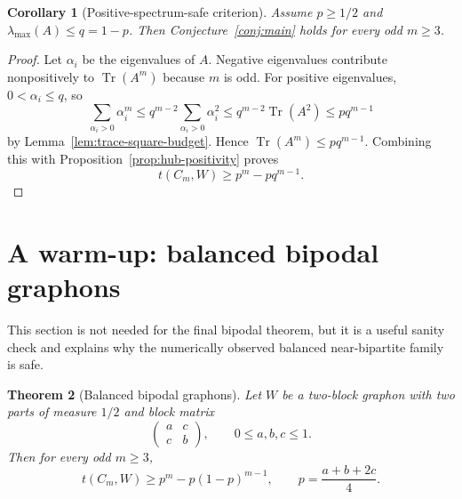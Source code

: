 \documentclass[11pt]{article}
\newtheorem{theorem}{Theorem}[section]
\newtheorem{corollary}[theorem]{Corollary}
\newcommand{\Tr}{\operatorname{Tr}}
\begin{document}
\begin{corollary}[Positive-spectrum-safe criterion]\label{cor:positive-spectrum-safe}
Assume $p\ge1/2$ and $\lambda_{\max}(A)\le q=1-p$.  Then Conjecture~\ref{conj:main} holds for every odd $m\ge3$.
\end{corollary}

\begin{proof}
Let $\alpha_i$ be the eigenvalues of $A$.  Negative eigenvalues contribute nonpositively to $\Tr(A^m)$ because $m$ is odd.  For positive eigenvalues, $0<\alpha_i\le q$, so
\[
        \sum_{\alpha_i>0}\alpha_i^m
        \le q^{m-2}\sum_{\alpha_i>0}\alpha_i^2
        \le q^{m-2}\Tr(A^2)
        \le p q^{m-1}
\]
by Lemma~\ref{lem:trace-square-budget}.  Hence $\Tr(A^m)\le pq^{m-1}$.  Combining this with Proposition~\ref{prop:hub-positivity} proves
\[
        t(C_m,W)\ge p^m-pq^{m-1}.
\]
\end{proof}

\section{A warm-up: balanced bipodal graphons}

This section is not needed for the final bipodal theorem, but it is a useful sanity check and explains why the numerically observed balanced near-bipartite family is safe.

\begin{theorem}[Balanced bipodal graphons]\label{thm:balanced-bipodal}
Let $W$ be a two-block graphon with two parts of measure $1/2$ and block matrix
\[
        \begin{pmatrix}a&c\\ c&b\end{pmatrix},
        \qquad 0\le a,b,c\le1.
\]
Then for every odd $m\ge3$,
\[
        t(C_m,W)\ge p^m-p(1-p)^{m-1},
        \qquad p=\frac{a+b+2c}{4}.
\]
\end{theorem}
\end{document}
